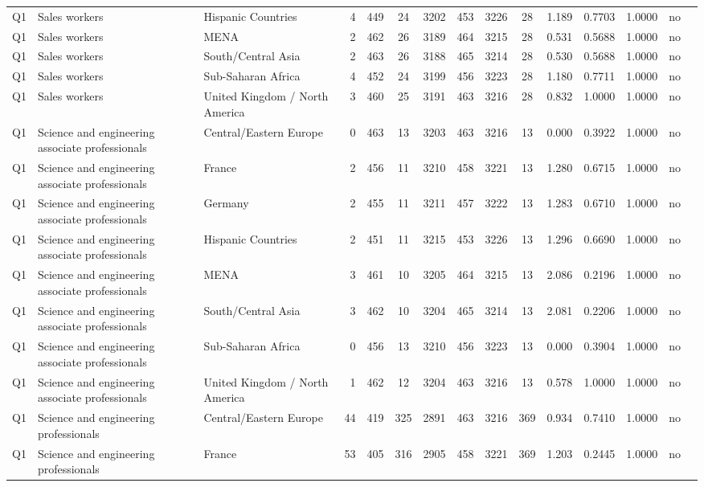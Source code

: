 \begin{longtable}{lllrcccccccccll}
Q1 & Sales workers & Hispanic Countries & 4 & 449 & 24 & 3202 & 453 & 3226 & 28 & 1.189 & 0.7703 & 1.0000 & no \\
Q1 & Sales workers & MENA & 2 & 462 & 26 & 3189 & 464 & 3215 & 28 & 0.531 & 0.5688 & 1.0000 & no \\
Q1 & Sales workers & South/Central Asia & 2 & 463 & 26 & 3188 & 465 & 3214 & 28 & 0.530 & 0.5688 & 1.0000 & no \\
Q1 & Sales workers & Sub-Saharan Africa & 4 & 452 & 24 & 3199 & 456 & 3223 & 28 & 1.180 & 0.7711 & 1.0000 & no \\
Q1 & Sales workers & United Kingdom / North America & 3 & 460 & 25 & 3191 & 463 & 3216 & 28 & 0.832 & 1.0000 & 1.0000 & no \\
Q1 & Science and engineering associate professionals & Central/Eastern Europe & 0 & 463 & 13 & 3203 & 463 & 3216 & 13 & 0.000 & 0.3922 & 1.0000 & no \\
Q1 & Science and engineering associate professionals & France & 2 & 456 & 11 & 3210 & 458 & 3221 & 13 & 1.280 & 0.6715 & 1.0000 & no \\
Q1 & Science and engineering associate professionals & Germany & 2 & 455 & 11 & 3211 & 457 & 3222 & 13 & 1.283 & 0.6710 & 1.0000 & no \\
Q1 & Science and engineering associate professionals & Hispanic Countries & 2 & 451 & 11 & 3215 & 453 & 3226 & 13 & 1.296 & 0.6690 & 1.0000 & no \\
Q1 & Science and engineering associate professionals & MENA & 3 & 461 & 10 & 3205 & 464 & 3215 & 13 & 2.086 & 0.2196 & 1.0000 & no \\
Q1 & Science and engineering associate professionals & South/Central Asia & 3 & 462 & 10 & 3204 & 465 & 3214 & 13 & 2.081 & 0.2206 & 1.0000 & no \\
Q1 & Science and engineering associate professionals & Sub-Saharan Africa & 0 & 456 & 13 & 3210 & 456 & 3223 & 13 & 0.000 & 0.3904 & 1.0000 & no \\
Q1 & Science and engineering associate professionals & United Kingdom / North America & 1 & 462 & 12 & 3204 & 463 & 3216 & 13 & 0.578 & 1.0000 & 1.0000 & no \\
Q1 & Science and engineering professionals & Central/Eastern Europe & 44 & 419 & 325 & 2891 & 463 & 3216 & 369 & 0.934 & 0.7410 & 1.0000 & no \\
Q1 & Science and engineering professionals & France & 53 & 405 & 316 & 2905 & 458 & 3221 & 369 & 1.203 & 0.2445 & 1.0000 & no \\

\end{longtable}
